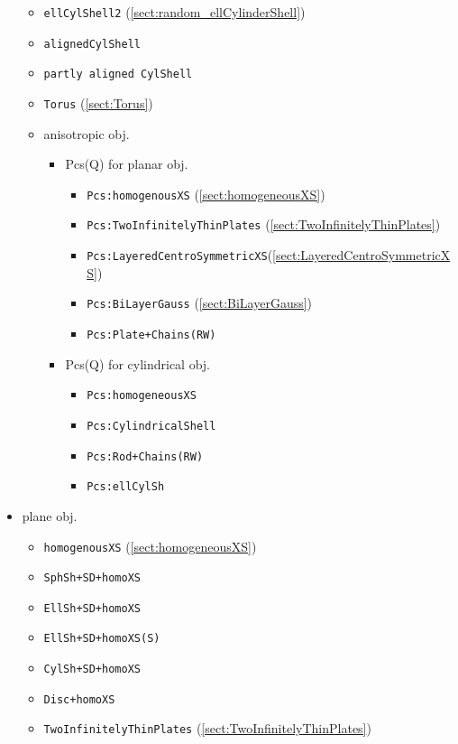 \begin{itemize}
\begin{itemize}
\item \texttt{ellCylShell2} (\ref{sect:random_ellCylinderShell})
\item \texttt{alignedCylShell}
\item \texttt{partly aligned CylShell}
\item \texttt{Torus} (\ref{sect:Torus})
\end{itemize}
\begin{itemize}
  \item anisotropic obj.
  \begin{itemize}
    \item Pcs(Q) for planar obj.
    \begin{itemize}
      \item \texttt{Pcs:homogenousXS} (\ref{sect:homogeneousXS})
      \item \texttt{Pcs:TwoInfinitelyThinPlates} (\ref{sect:TwoInfinitelyThinPlates})
      \item \texttt{Pcs:LayeredCentroSymmetricXS}(\ref{sect:LayeredCentroSymmetricXS})
      \item \texttt{Pcs:BiLayerGauss} (\ref{sect:BiLayerGauss})
      \item \texttt{Pcs:Plate+Chains(RW)}
    \end{itemize}
    \item Pcs(Q) for cylindrical obj.
    \begin{itemize}
      \item \texttt{Pcs:homogeneousXS}
      \item \texttt{Pcs:CylindricalShell}
      \item \texttt{Pcs:Rod+Chains(RW)}
      \item \texttt{Pcs:ellCylSh}
    \end{itemize}
  \end{itemize}
\end{itemize}
\item plane obj.
\begin{itemize}
  \item \texttt{homogenousXS} (\ref{sect:homogeneousXS})
  \item \texttt{SphSh+SD+homoXS}
  \item \texttt{EllSh+SD+homoXS}
  \item \texttt{EllSh+SD+homoXS(S)}
  \item \texttt{CylSh+SD+homoXS}
  \item \texttt{Disc+homoXS}
  \item \texttt{TwoInfinitelyThinPlates} (\ref{sect:TwoInfinitelyThinPlates})

\end{itemize}
\end{itemize}
